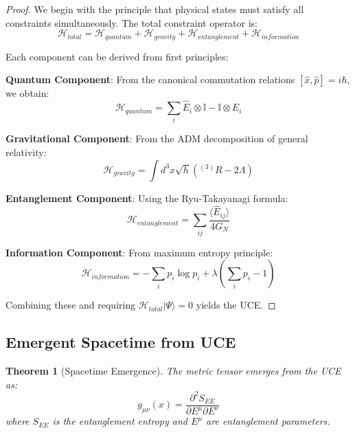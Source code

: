 \documentclass[12pt,a4paper]{article}
\newtheorem{theorem}{Theorem}[section]
\begin{document}
\begin{proof}
We begin with the principle that physical states must satisfy all constraints simultaneously. The total constraint operator is:
\begin{equation}
\mathcal{H}_{total} = \mathcal{H}_{quantum} + \mathcal{H}_{gravity} + \mathcal{H}_{entanglement} + \mathcal{H}_{information}
\end{equation}

Each component can be derived from first principles:

\textbf{Quantum Component}: From the canonical commutation relations $[\hat{x}, \hat{p}] = i\hbar$, we obtain:
\begin{equation}
\mathcal{H}_{quantum} = \sum_i \hat{E}_i \otimes \mathbb{I} - \mathbb{I} \otimes \hat{E}_i
\end{equation}

\textbf{Gravitational Component}: From the ADM decomposition of general relativity:
\begin{equation}
\mathcal{H}_{gravity} = \int d^3x \sqrt{h} \left( {}^{(3)}R - 2\Lambda \right)
\end{equation}

\textbf{Entanglement Component}: Using the Ryu-Takayanagi formula:
\begin{equation}
\mathcal{H}_{entanglement} = \sum_{ij} \frac{\langle \hat{E}_{ij} \rangle}{4G_N}
\end{equation}

\textbf{Information Component}: From maximum entropy principle:
\begin{equation}
\mathcal{H}_{information} = -\sum_i p_i \log p_i + \lambda \left(\sum_i p_i - 1\right)
\end{equation}

Combining these and requiring $\mathcal{H}_{total}|\Psi\rangle = 0$ yields the UCE.
\end{proof}

\subsection{Emergent Spacetime from UCE}

\begin{theorem}[Spacetime Emergence]
The metric tensor emerges from the UCE as:
\begin{equation}
g_{\mu\nu}(x) = \frac{\partial^2 S_{EE}}{\partial E^\mu \partial E^\nu}
\end{equation}
where $S_{EE}$ is the entanglement entropy and $E^\mu$ are entanglement parameters.
\end{theorem}
\end{document}
